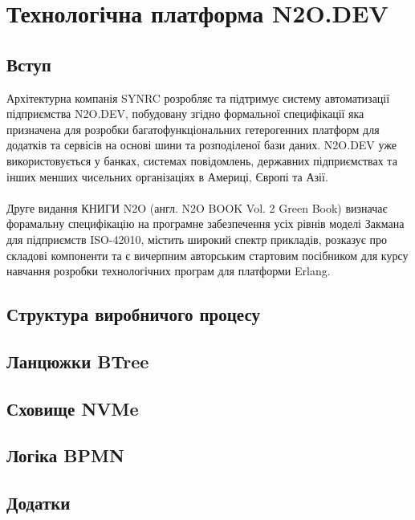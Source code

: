 \chapter{Технологічна платформа N2O.DEV}

\section{Вступ}

Архітектурна компанія SYNRC розробляє та підтримує систему автоматизації підприємства N2O.DEV,
побудовану згідно формальної специфікації яка призначена для розробки багатофункціональних
гетерогенних платформ для додатків та сервісів на основі шини та розподіленої бази даних.
N2O.DEV уже використовується у банках, системах повідомлень, державних підприємствах та
інших менших чисельних організаціях в Америці, Європі та Азії.
\\
\\
Друге видання КНИГИ N2O (англ. N2O BOOK Vol. 2 Green Book) визначає форамальну специфікацію
на програмне забезпечення усіх рівнів моделі Закмана для підприємств ISO-42010, містить
широкий спектр прикладів, розказує про складові компоненти та є вичерпним авторським
стартовим посібником для курсу навчання розробки технологічних програм для платформи Erlang.

\section{Структура виробничого процесу}

\section{Ланцюжки BTree}

\section{Сховище NVMe}

\section{Логіка BPMN}

\section{Додатки}
